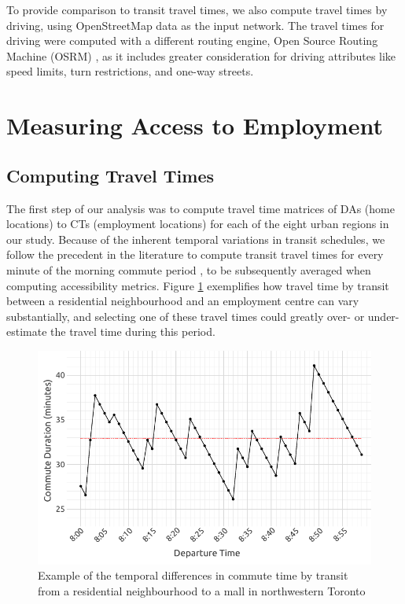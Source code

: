 \documentclass[11 pt, letterpaper]{article}
\begin{document}
{To provide comparison to transit travel times, we also compute travel times by driving, using OpenStreetMap data as the input network. The travel times for driving were computed with a different routing engine, Open Source Routing Machine (OSRM) \cite{luxen-vetter-2011}, as it includes greater consideration for driving attributes like speed limits, turn restrictions, and one-way streets.



\newpage

\section{Measuring Access to Employment}

\subsection{Computing Travel Times}

The first step of our analysis was to compute travel time matrices of DAs (home locations) to CTs (employment locations) for each of the eight urban regions in our study. Because of the inherent temporal variations in transit schedules, we follow the precedent in the literature to compute transit travel times for every minute of the morning commute period \cite{owen2015,farber2017}, to be subsequently averaged when computing accessibility metrics. Figure \ref{travel_time_morning} exemplifies how travel time by transit between a residential neighbourhood and an employment centre can vary substantially, and selecting one of these travel times could greatly over- or under-estimate the travel time during this period.

\vspace{4mm}
\begin{figure}[H]
	\caption{Example of the temporal differences in commute time by transit from a residential neighbourhood to a mall in northwestern Toronto} 
		\label{travel_time_morning}
	\centerline{\includegraphics[width=5in]{figures/trip_time_dept/trip_time_dept.pdf}}
	\vspace{2mm}
\end{figure}


}
\end{document}
